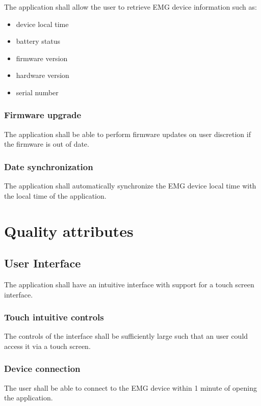 \documentclass[12pt,a4paper]{article}
\begin{document}
The application shall allow the user to retrieve EMG device information such as: 

\begin{itemize}
\item device local time
\item battery status
\item firmware version
\item hardware version
\item serial number
\end{itemize}

\subsubsection{Firmware upgrade}

The application shall be able to perform firmware updates on user discretion if the firmware is out of date.

\subsubsection{Date synchronization}

The application shall automatically synchronize the EMG device local time with the local time of the application.

\section{Quality attributes}

\subsection{User Interface}

The application shall have an intuitive interface with support for a touch screen interface.

\subsubsection{Touch intuitive controls}

The controls of the interface shall be sufficiently large such that an user could access it via a touch screen.

\subsubsection{Device connection}

The user shall be able to connect to the EMG device within 1 minute of opening the application.
\end{document}
